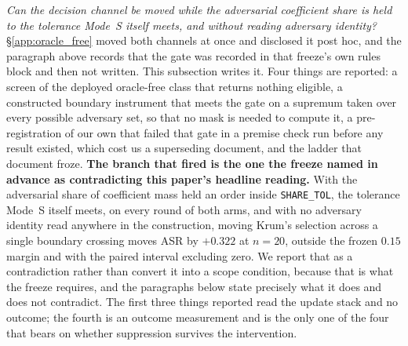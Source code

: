 \documentclass{article}
\begin{document}
\noindent \emph{Can the decision channel be moved while the adversarial coefficient share is held to the tolerance Mode~S itself meets, and without reading adversary identity?} §\ref{app:oracle_free} moved both channels at once and disclosed it post hoc, and the paragraph above records that the gate was recorded in that freeze's own rules block and then not written. This subsection writes it. Four things are reported: a screen of the deployed oracle-free class that returns nothing eligible, a constructed boundary instrument that meets the gate on a supremum taken over every possible adversary set, so that no mask is needed to compute it, a pre-registration of our own that failed that gate in a premise check run before any result existed, which cost us a superseding document, and the ladder that document froze. \textbf{The branch that fired is the one the freeze named in advance as contradicting this paper's headline reading.} With the adversarial share of coefficient mass held an order inside \texttt{SHARE\_TOL}, the tolerance Mode~S itself meets, on every round of both arms, and with no adversary identity read anywhere in the construction, moving Krum's selection across a single boundary crossing moves ASR by $\mathbf{+0.322}$ at $n{=}20$, outside the frozen $0.15$ margin and with the paired interval excluding zero. We report that as a contradiction rather than convert it into a scope condition, because that is what the freeze requires, and the paragraphs below state precisely what it does and does not contradict. The first three things reported read the update stack and no outcome; the fourth is an outcome measurement and is the only one of the four that bears on whether suppression survives the intervention.
\end{document}
